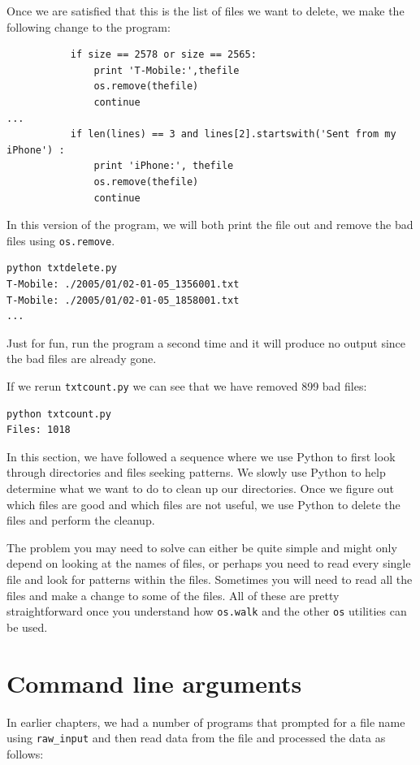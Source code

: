 \documentclass[10pt]{book}
\begin{document}
Once we are satisfied that this is the list of files we want to delete,
we make the following change to the program:
\beforeverb
\begin{verbatim}
           if size == 2578 or size == 2565:
               print 'T-Mobile:',thefile
               os.remove(thefile)
               continue
...
           if len(lines) == 3 and lines[2].startswith('Sent from my iPhone') :
               print 'iPhone:', thefile
               os.remove(thefile)
               continue
\end{verbatim}
\afterverb
%
In this version of the program, we will both print the file out 
and remove the bad files
using {\tt os.remove}.

\beforeverb
\begin{verbatim}
python txtdelete.py 
T-Mobile: ./2005/01/02-01-05_1356001.txt
T-Mobile: ./2005/01/02-01-05_1858001.txt
...
\end{verbatim}
\afterverb
%
Just for fun, run the program a second time and it will produce no output
since the bad files are already gone.

If we rerun {\tt txtcount.py} we can see that we have removed
899 bad files:
\beforeverb
\begin{verbatim}
python txtcount.py 
Files: 1018
\end{verbatim}
\afterverb
%
In this section, we have followed a sequence where we use Python 
to first look through directories and files seeking
patterns.  We slowly use Python to help determine what we 
want to do to clean up our directories.  Once we
figure out which files are good and which files are 
not useful, we use Python to delete the files and 
perform the cleanup.

The problem you may need to solve can either be quite simple 
and might only depend on looking at the names of files,
or perhaps you need to read every single file and
look for patterns within the files.  Sometimes 
you will need to read all the files and make a change 
to some of the files.  All of these are pretty 
straightforward once you understand how {\tt os.walk}
and the other {\tt os} utilities can be used.

\section{Command line arguments}


In earlier chapters, we had a number of programs that prompted
for a file name using \verb"raw_input" and then read data 
from the file and processed the data as follows:
\end{document}
